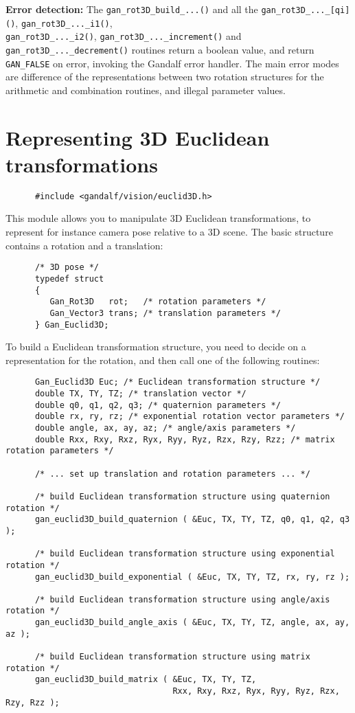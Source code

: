 {\bf Error detection:} The {\tt gan\_rot3D\_build\_...()} and all the
{\tt gan\_rot3D\_...\_[qi]()}, {\tt gan\_rot3D\_...\_i1()},
\\{\tt gan\_rot3D\_...\_i2()}, {\tt gan\_rot3D\_...\_increment()} and
{\tt gan\_rot3D\_...\_decrement()} routines return a boolean value,
and return {\tt GAN\_FALSE} on error, invoking the Gandalf error handler.
The main error modes are difference of the representations between two
rotation structures for the arithmetic and combination routines,
and illegal parameter values.

\section{Representing 3D Euclidean transformations}
\begin{verbatim}
      #include <gandalf/vision/euclid3D.h>
\end{verbatim}
This module allows you to manipulate 3D Euclidean transformations, to
represent for instance camera pose relative to a 3D scene. The basic
structure contains a rotation and a translation:
\begin{verbatim}
      /* 3D pose */
      typedef struct
      {
         Gan_Rot3D   rot;   /* rotation parameters */
         Gan_Vector3 trans; /* translation parameters */
      } Gan_Euclid3D;
\end{verbatim}

To build a Euclidean transformation structure, you need to decide on a
representation for the rotation, and then call one of the following routines:
\begin{verbatim}
      Gan_Euclid3D Euc; /* Euclidean transformation structure */
      double TX, TY, TZ; /* translation vector */
      double q0, q1, q2, q3; /* quaternion parameters */
      double rx, ry, rz; /* exponential rotation vector parameters */
      double angle, ax, ay, az; /* angle/axis parameters */
      double Rxx, Rxy, Rxz, Ryx, Ryy, Ryz, Rzx, Rzy, Rzz; /* matrix rotation parameters */

      /* ... set up translation and rotation parameters ... */

      /* build Euclidean transformation structure using quaternion rotation */
      gan_euclid3D_build_quaternion ( &Euc, TX, TY, TZ, q0, q1, q2, q3 );

      /* build Euclidean transformation structure using exponential rotation */
      gan_euclid3D_build_exponential ( &Euc, TX, TY, TZ, rx, ry, rz );

      /* build Euclidean transformation structure using angle/axis rotation */
      gan_euclid3D_build_angle_axis ( &Euc, TX, TY, TZ, angle, ax, ay, az );

      /* build Euclidean transformation structure using matrix rotation */
      gan_euclid3D_build_matrix ( &Euc, TX, TY, TZ,
                                  Rxx, Rxy, Rxz, Ryx, Ryy, Ryz, Rzx, Rzy, Rzz );
\end{verbatim}

